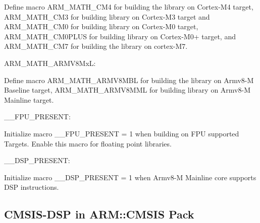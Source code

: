 Define macro A\+R\+M\+\_\+\+M\+A\+T\+H\+\_\+\+C\+M4 for building the library on Cortex-\/\+M4 target, A\+R\+M\+\_\+\+M\+A\+T\+H\+\_\+\+C\+M3 for building library on Cortex-\/\+M3 target and A\+R\+M\+\_\+\+M\+A\+T\+H\+\_\+\+C\+M0 for building library on Cortex-\/\+M0 target, A\+R\+M\+\_\+\+M\+A\+T\+H\+\_\+\+C\+M0\+P\+L\+US for building library on Cortex-\/\+M0+ target, and A\+R\+M\+\_\+\+M\+A\+T\+H\+\_\+\+C\+M7 for building the library on cortex-\/\+M7.


\begin{DoxyItemize}
\item A\+R\+M\+\_\+\+M\+A\+T\+H\+\_\+\+A\+R\+M\+V8\+MxL\+:
\end{DoxyItemize}

Define macro A\+R\+M\+\_\+\+M\+A\+T\+H\+\_\+\+A\+R\+M\+V8\+M\+BL for building the library on Armv8-\/M Baseline target, A\+R\+M\+\_\+\+M\+A\+T\+H\+\_\+\+A\+R\+M\+V8\+M\+ML for building library on Armv8-\/M Mainline target.


\begin{DoxyItemize}
\item \+\_\+\+\_\+\+F\+P\+U\+\_\+\+P\+R\+E\+S\+E\+NT\+:
\end{DoxyItemize}

Initialize macro \+\_\+\+\_\+\+F\+P\+U\+\_\+\+P\+R\+E\+S\+E\+NT = 1 when building on F\+PU supported Targets. Enable this macro for floating point libraries.


\begin{DoxyItemize}
\item \+\_\+\+\_\+\+D\+S\+P\+\_\+\+P\+R\+E\+S\+E\+NT\+:
\end{DoxyItemize}

Initialize macro \+\_\+\+\_\+\+D\+S\+P\+\_\+\+P\+R\+E\+S\+E\+NT = 1 when Armv8-\/M Mainline core supports D\+SP instructions.



 \subsection*{C\+M\+S\+I\+S-\/\+D\+SP in A\+R\+M\+::\+C\+M\+S\+IS Pack }

